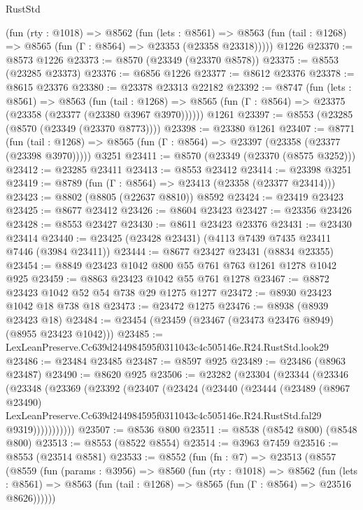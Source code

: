 \begin{lexlean}{RustStd}
\begin{coremodule}
    (fun (rty : @1018) =>
    @8562
      (fun (lets : @8561) =>
      @8563 (fun (tail : @1268) => @8565 (fun (Γ : @8564) => @23353 (@23358 @23318)))))
    @1226
@23370 := @8573 @1226
@23373 := @8570 (@23349 (@23370 @8578))
@23375 := @8553 (@23285 @23373)
@23376 := @6856 @1226
@23377 := @8612 @23376
@23378 := @8615 @23376
@23380 := @23378 @23313 @22182
@23392 := @8747
    (fun (lets : @8561) =>
    @8563
      (fun (tail : @1268) =>
      @8565 (fun (Γ : @8564) => @23375 (@23358 (@23377 (@23380 @3967 @3970))))))
    @1261
@23397 := @8553 (@23285 (@8570 (@23349 (@23370 @8773))))
@23398 := @23380 @1261
@23407 := @8771
    (fun (tail : @1268) => @8565 (fun (Γ : @8564) => @23397 (@23358 (@23377 (@23398 @3970)))))
    @3251
@23411 := @8570 (@23349 (@23370 (@8575 @3252)))
@23412 := @23285 @23411
@23413 := @8553 @23412
@23414 := @23398 @3251
@23419 := @8789 (fun (Γ : @8564) => @23413 (@23358 (@23377 @23414)))
@23423 := @8802 (@8805 (@22637 @8810)) @8592
@23424 := @23419 @23423
@23425 := @8677 @23412
@23426 := @8604 @23423
@23427 := @23356 @23426
@23428 := @8553 @23427
@23430 := @8611 @23423 @23376
@23431 := @23430 @23414
@23440 := @23425 (@23428 @23431) (@4113 @7439 @7435 @23411 @7446 (@3984 @23411))
@23444 := @8677 @23427 @23431 (@8834 @23355)
@23454 := @8849 @23423 @1042 @800 @55 @761 @763 @1261 @1278 @1042 @925
@23459 := @8863 @23423 @1042 @55 @761 @1278
@23467 := @8872 @23423 @1042 @52 @54 @738 @29 @1275 @1277
@23472 := @8930 @23423 @1042 @18 @738 @18
@23473 := @23472 @1275
@23476 := @8938 (@8939 @23423 @18)
@23484 := @23454 (@23459 (@23467 (@23473 @23476 @8949) (@8955 @23423 @1042)))
@23485 := LexLeanPreserve.Cc639d244984595f0311043c4c505146e.R24.RustStd.look29
@23486 := @23484 @23485
@23487 := @8597 @925
@23489 := @23486 (@8963 @23487)
@23490 := @8620 @925
@23506 := @23282
    (@23304
      (@23344
        (@23346
          (@23348
            (@23369
              (@23392
                (@23407
                  (@23424
                    (@23440
                      (@23444
                        (@23489
                          (@8967 @23490)
                          LexLeanPreserve.Cc639d244984595f0311043c4c505146e.R24.RustStd.fal29
                          @9319)))))))))))
@23507 := @8536 @800
@23511 := @8538 (@8542 @800) (@8548 @800)
@23513 := @8553 (@8522 @8554)
@23514 := @3963 @7459
@23516 := @8553 (@23514 @8581)
@23533 := @8552
    (fun (fn : @7) =>
    @23513
      (@8557
        (@8559
          (fun (params : @3956) =>
          @8560
            (fun (rty : @1018) =>
            @8562
              (fun (lets : @8561) =>
              @8563 (fun (tail : @1268) => @8565 (fun (Γ : @8564) => @23516 @8626))))))

\end{coremodule}
\end{lexlean}
